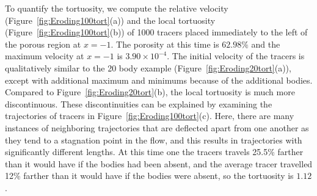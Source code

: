 \documentclass[preprint,10pt]{elsarticle}
\begin{document}
To quantify the tortuosity, we compute the relative velocity
(Figure~\ref{fig:Eroding100tort}(a)) and the local tortuosity
(Figure~\ref{fig:Eroding100tort}(b)) of 1000 tracers placed immediately
to the left of the porous region at $x=-1$.  The porosity at this
time is $62.98\%$ and the maximum velocity at $x=-1$ is
$3.90 \times 10^{-4}$. The initial velocity of the tracers is
qualitatively similar to the 20 body example
(Figure~\ref{fig:Eroding20tort}(a)), except with additional maximum and
minimums because of the additional bodies.  Compared to
Figure~\ref{fig:Eroding20tort}(b), the local tortuosity is much more
discontinuous.  These discontinuities can be explained by examining the
trajectories of tracers in Figure~\ref{fig:Eroding100tort}(c).  Here,
there are many instances of neighboring trajectories that are deflected
apart from one another as they tend to a stagnation point in the flow,
and this results in trajectories with significantly different lengths.
At this time one the tracers travels 25.5\% farther than it would have
if the bodies had been absent, and the average tracer travelled 12\%
farther than it would have if the bodies were absent, so the tortuosity
is $1.12$.
\end{document}
